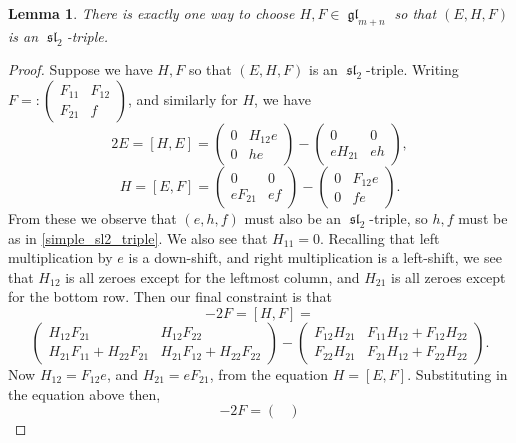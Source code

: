 \documentclass[12pt,psamsfonts]{article}
\DeclareMathOperator{\gl}{\mathfrak{gl}}
\DeclareMathOperator{\spl}{\mathfrak{sl}}
\newtheorem{lemma}[theorem]{Lemma}
\begin{document}
\begin{lemma}\label{sl2_triple}
    There is exactly one way to choose \(H, F \in \gl_{m + n}\) so that \((E, H, F)\) is an \(\spl_2\)-triple.
\end{lemma}
\begin{proof}
Suppose we have \(H, F\) so that \((E, H, F)\) is an \(\spl_2\)-triple.
Writing \(F =: \begin{pmatrix}
    F_{11} & F_{12} \\
    F_{21} & f
\end{pmatrix}\), and similarly for \(H\), we have
\[2E = [H, E] = \begin{pmatrix}
    0 & H_{12}e \\
    0 & he
\end{pmatrix} - \begin{pmatrix}
    0 & 0 \\
    e H_{21} & eh
\end{pmatrix},\]
\[H = [E, F] = \begin{pmatrix}
    0 & 0 \\
    e F_{21} & ef
\end{pmatrix} - \begin{pmatrix}
    0 & F_{12}e \\
    0 & fe
\end{pmatrix}.\]
From these we observe that \((e, h, f)\) must also be an \(\spl_2\)-triple, so \(h, f\) must be as in \cref{simple_sl2_triple}.
We also see that \(H_{11} = 0\).
Recalling that left multiplication by \(e\) is a down-shift, and right multiplication is a left-shift, we see that \(H_{12}\) is all zeroes except for the leftmost column, and \(H_{21}\) is all zeroes except for the bottom row.
Then our final constraint is that 
\[-2F = [H, F] = \]
\[\begin{pmatrix}
    H_{12} F_{21} & H_{12} F_{22} \\
    H_{21} F_{11} + H_{22} F_{21} & H_{21} F_{12} + H_{22} F_{22}
\end{pmatrix} - \begin{pmatrix}
    F_{12} H_{21} & F_{11} H_{12} + F_{12} H_{22} \\
    F_{22} H_{21} & F_{21} H_{12} + F_{22} H_{22}
\end{pmatrix}.\]
Now \(H_{12} = F_{12}e\), and \(H_{21} = eF_{21}\), from the equation \(H = [E, F]\).
Substituting in the equation above then,
\[-2F = \begin{pmatrix}

\end{pmatrix}\]
\end{proof}
\end{document}
